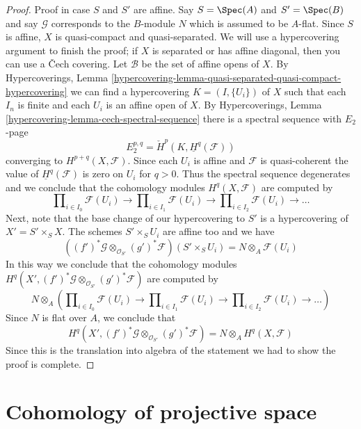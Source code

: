 \begin{proof}
\medskip\noindent
Proof in case $S$ and $S'$ are affine. Say $S = \Spec(A)$ and $S' = \Spec(B)$
and say $\mathcal{G}$ corresponds to the $B$-module $N$ which is assumed to be
$A$-flat. Since $S$ is affine, $X$ is quasi-compact and quasi-separated.
We will use a hypercovering argument to finish the proof; if $X$ is separated
or has affine diagonal, then you can use a {\v C}ech covering.
Let $\mathcal{B}$ be the set of affine opens of $X$. By
Hypercoverings,
Lemma \ref{hypercovering-lemma-quasi-separated-quasi-compact-hypercovering}
we can find a hypercovering $K = (I, \{U_i\})$ of $X$ such that each
$I_n$ is finite and each $U_i$ is an affine open of $X$. By
Hypercoverings, Lemma \ref{hypercovering-lemma-cech-spectral-sequence}
there is a spectral sequence with $E_2$-page
$$
E_2^{p, q} = \check{H}^p(K, \underline{H}^q(\mathcal{F}))
$$
converging to $H^{p + q}(X, \mathcal{F})$. Since each $U_i$ is affine
and $\mathcal{F}$ is quasi-coherent the value of
$\underline{H}^q(\mathcal{F})$ is zero on $U_i$ for $q > 0$. Thus the
spectral sequence degenerates and we conclude that the cohomology
modules $H^q(X, \mathcal{F})$ are computed by
$$
\prod\nolimits_{i \in I_0} \mathcal{F}(U_i)
\to
\prod\nolimits_{i \in I_1} \mathcal{F}(U_i)
\to
\prod\nolimits_{i \in I_2} \mathcal{F}(U_i)
\to \ldots
$$
Next, note that the base change of our hypercovering to
$S'$ is a hypercovering of $X' = S' \times_S X$.
The schemes $S' \times_S U_i$ are affine too
and we have
$$
\left((f')^*\mathcal{G} \otimes_{\mathcal{O}_{S'}} (g')^*\mathcal{F}\right)
(S' \times_S U_i) =
N \otimes_A \mathcal{F}(U_i)
$$
In this way we conclude that the cohomology modules
$H^q(X', (f')^*\mathcal{G} \otimes_{\mathcal{O}_{S'}} (g')^*\mathcal{F})$
are computed by
$$
N \otimes_A \left(
\prod\nolimits_{i \in I_0} \mathcal{F}(U_i)
\to
\prod\nolimits_{i \in I_1} \mathcal{F}(U_i)
\to
\prod\nolimits_{i \in I_2} \mathcal{F}(U_i)
\to \ldots
\right)
$$
Since $N$ is flat over $A$, we conclude that
$$
H^q(X', (f')^*\mathcal{G} \otimes_{\mathcal{O}_{S'}} (g')^*\mathcal{F})
=
N \otimes_A H^q(X, \mathcal{F})
$$
Since this is the translation into algebra of the statement
we had to show the proof is complete.
\end{proof}







\section{Cohomology of projective space}
\label{section-cohomology-projective-space}

